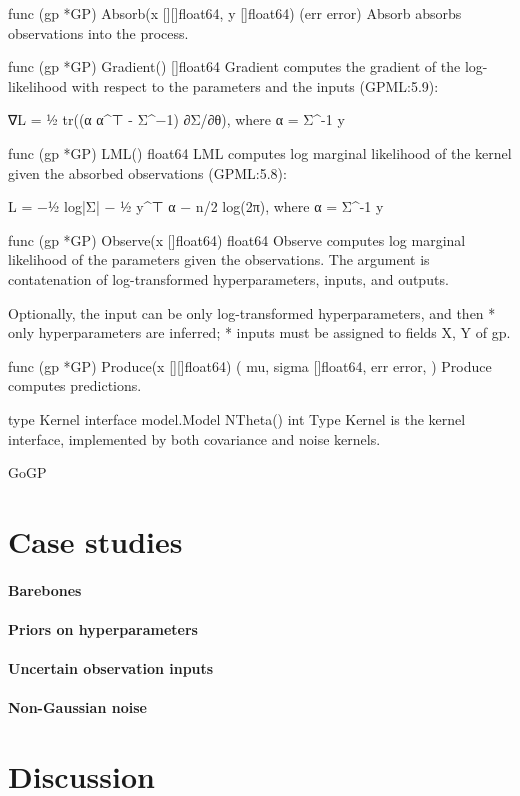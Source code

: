 \documentclass[sigplan,review]{acmart}\settopmatter{printfolios=true,printccs=false,printacmref=false}
\begin{document}
func (gp *GP) Absorb(x [][]float64, y []float64) (err error)
    Absorb absorbs observations into the process.

func (gp *GP) Gradient() []float64
    Gradient computes the gradient of the log-likelihood with respect to the
    parameters and the inputs (GPML:5.9):

    ∇L = ½ tr((α α^⊤ - Σ^−1) ∂Σ/∂θ), where α = Σ^-1 y

func (gp *GP) LML() float64
    LML computes log marginal likelihood of the kernel given the absorbed
    observations (GPML:5.8):

    L = −½ log|Σ| − ½ y^⊤ α − n/2 log(2π), where α = Σ^-1 y

func (gp *GP) Observe(x []float64) float64
    Observe computes log marginal likelihood of the parameters given the
    observations. The argument is contatenation of log-transformed
    hyperparameters, inputs, and outputs.

    Optionally, the input can be only log-transformed hyperparameters, and then
    * only hyperparameters are inferred; * inputs must be assigned to fields X,
    Y of gp.

func (gp *GP) Produce(x [][]float64) (
	mu, sigma []float64,
	err error,
)
    Produce computes predictions.

type Kernel interface {
	model.Model
	NTheta() int
}
    Type Kernel is the kernel interface, implemented by both covariance and
    noise kernels.


GoGP

\section{Case studies}

\paragraph{Barebones}

\paragraph{Priors on hyperparameters}

\paragraph{Uncertain observation inputs}

\paragraph{Non-Gaussian noise}

\section{Discussion}


\end{document}
